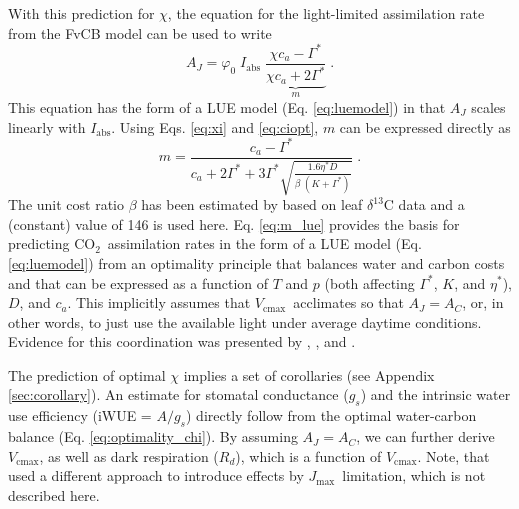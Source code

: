 \documentclass{myreport}
\newcommand{\coo}{CO$_2$}
\newcommand{\vcmax}{$V_{\text{cmax}}$}
\newcommand{\jmax}{$J_{\text{max}}$}
\begin{document}
With this prediction for $\chi$, the equation for the light-limited assimilation rate from the FvCB model can be used to write
\begin{equation}
\label{eq:aj}
        A_J = \varphi_0 \; I_{\mathrm{abs}}\;\underbrace{\frac{\chi c_a - \Gamma^{\ast}}{\chi c_a + 2\Gamma^{\ast}}}_{m} \;.
\end{equation}
This equation has the form of a LUE model (Eq. \ref{eq:luemodel}) in that $A_J$ scales linearly with $I_{\mathrm{abs}}$. Using Eqs. \ref{eq:xi} and \ref{eq:ciopt}, $m$ can be expressed directly as
\begin{equation}
\label{eq:m_lue}
    m = \frac{c_a - \Gamma^{\ast}}{c_a + 2 \Gamma^{\ast} + 3 \Gamma^{\ast} \sqrt{\frac{1.6 \eta^{\ast} D }{\beta\;(K+\Gamma^{\ast})}}} \;.
\end{equation}
The unit cost ratio $\beta$ has been estimated by \cite{wang17natpl} based on leaf $\delta^{13}$C data and a (constant) value of 146 is used here. Eq. \ref{eq:m_lue} provides the basis for predicting \coo\ assimilation rates in the form of a LUE model (Eq. \ref{eq:luemodel}) from an optimality principle that balances water and carbon costs and that can be expressed as a function of $T$ and $p$ (both affecting $\Gamma^{\ast}$, $K$, and $\eta^\ast$), $D$, and $c_a$. This implicitly assumes that \vcmax\ acclimates so that $A_J=A_C$, or, in other words, to just use the available light under average daytime conditions. Evidence for this coordination was presented by \cite{chen93}, \cite{haxeltine96}, and \cite{maire12po}. 

The prediction of optimal $\chi$ implies a set of corollaries (see Appendix \ref{sec:corollary}). An estimate for stomatal conductance ($g_s$) and the intrinsic water use efficiency (iWUE = $A/g_s$) directly follow from the optimal water-carbon balance (Eq. \ref{eq:optimality_chi}). By assuming $A_J=A_C$, we can further derive \vcmax , as well as dark respiration ($R_d$), which is a function of \vcmax . Note, that \cite{smith19ecollett} used a different approach to introduce effects by \jmax\ limitation, which is not described here.
\end{document}
